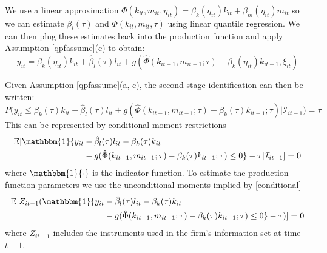 \documentclass[11pt]{article}
\begin{document}
We use a linear approximation $\Phi(k_{it}, m_{it}, \eta_{it})=\beta_{k}(\eta_{it})k_{it}+\beta_{m}(\eta_{it})m_{it}$ so we can estimate $\beta_{l}(\tau)$ and $\Phi(k_{it}, m_{it}, \tau)$ using linear quantile regression. We can then plug these estimates back into the production function and apply Assumption \eqref{qpfassume}(c) to obtain:
\begin{equation} \label{qpf2nd}
y_{it}=\beta_{k}(\eta_{it})k_{it}+\hat{\beta}_{l}(\tau)l_{it}+g(\hat{\Phi}(k_{it-1}, m_{it-1}; \tau)-\beta_{k}(\eta_{it})k_{it-1}, \xi_{it})
\end{equation}

Given Assumption \eqref{qpfassume}(a, c), the second stage identification can then be written:
\begin{equation} \label{2ndstageidentification}
P\big(y_{it}\leq \beta_{k}(\tau)k_{it}+\hat{\beta}_{l}(\tau)l_{it}+g(\hat{\Phi}(k_{it-1}, m_{it-1}; \tau)-\beta_{k}(\tau)k_{it-1}; \tau)|\mathcal{I}_{it-1}\big)=\tau
\end{equation}
This can be represented by conditional moment restrictions
\begin{equation} \label{conditional}
	\begin{split}
	\mathbb{E}[\mathbbm{1}\{y_{it}&-\hat{\beta}_{l}(\tau)l_{it}-\beta_{k}(\tau)k_{it}\\
	&-g(\hat{\Phi}(k_{it-1}, m_{it-1}; \tau)-\beta_{k}(\tau)k_{it-1}; \tau)\leq 0\}-\tau|\mathcal{I}_{it-1}]=0
	\end{split}
\end{equation}
where $\mathbbm{1}\{\cdot\}$ is the indicator function. To estimate the production function parameters we use the unconditional moments implied by \eqref{conditional}
\begin{equation}
	\begin{split}
	\mathbb{E}[Z_{it-1}(\mathbbm{1}\{y_{it}&-\hat{\beta}_{l}(\tau)l_{it}-\beta_{k}(\tau)k_{it}\\
	&-g(\hat{\Phi}(k_{it-1}, m_{it-1}; \tau)-\beta_{k}(\tau)k_{it-1}; \tau)\leq 0\}-\tau)]=0
	\end{split}
\end{equation}
where $Z_{it-1}$ includes the instruments used in the firm's information set at time $t-1$.
\end{document}
